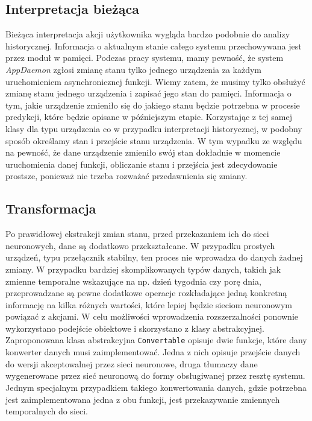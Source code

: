 
\subsection{Interpretacja bieżąca} \label{subsec:interpretacja}
Bieżąca interpretacja akcji użytkownika wygląda bardzo podobnie do analizy historycznej. Informacja o aktualnym stanie całego systemu przechowywana jest przez moduł w pamięci. Podczas pracy systemu, mamy pewność, że system \textit{AppDaemon} zgłosi zmianę stanu tylko jednego urządzenia za każdym uruchomieniem asynchronicznej funkcji. Wiemy zatem, że musimy tylko obsłużyć zmianę stanu jednego urządzenia i zapisać jego stan do pamięci. Informacja o tym, jakie urządzenie zmieniło się do jakiego stanu będzie potrzebna w procesie predykcji, które będzie opisane w późniejszym etapie. Korzystając z tej samej klasy dla typu urządzenia co w przypadku interpretacji historycznej, w podobny sposób określamy stan i przejście stanu urządzenia. W tym wypadku ze względu na pewność, że dane urządzenie zmieniło swój stan dokładnie w momencie uruchomienia danej funkcji, obliczanie stanu i przejścia jest zdecydowanie prostsze, ponieważ nie trzeba rozważać przedawnienia się zmiany.

\subsection{Transformacja} \label{subsec:transformacja}
Po prawidłowej ekstrakcji zmian stanu, przed przekazaniem ich do sieci neuronowych, dane są dodatkowo przekształcane. W przypadku prostych urządzeń, typu przełącznik stabilny, ten proces nie wprowadza do danych żadnej zmiany. W przypadku bardziej skomplikowanych typów danych, takich jak zmienne temporalne wskazujące na np. dzień tygodnia czy porę dnia, przeprowadzane są pewne dodatkowe operacje rozkładające jedną konkretną informację na kilka różnych wartości, które lepiej będzie sieciom neuronowym powiązać z akcjami. W celu możliwości wprowadzenia rozszerzalności ponownie wykorzystano podejście obiektowe i skorzystano z klasy abstrakcyjnej. Zaproponowana klasa abstrakcyjna \verb+Convertable+ opisuje dwie funkcje, które dany konwerter danych musi zaimplementować. Jedna z nich opisuje przejście danych do wersji akceptowalnej przez sieci neuronowe, druga tłumaczy dane wygenerowane przez sieć neuronową do formy obsługiwanej przez resztę systemu. Jednym specjalnym przypadkiem takiego konwertowania danych, gdzie potrzebna jest zaimplementowana jedna z obu funkcji, jest przekazywanie zmiennych temporalnych do sieci.


